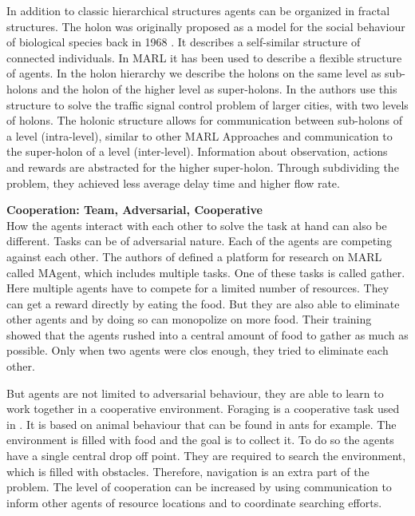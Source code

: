 In addition to classic hierarchical structures agents can be organized in fractal structures. The holon was originally proposed as a model for the social behaviour of biological species back in 1968 \citep{koestler1968ghost}. It describes a self-similar structure of connected individuals. In MARL it has been used to describe a flexible structure of agents. In the holon hierarchy we describe the holons on the same level as sub-holons and the holon of the higher level as super-holons. In \citet{Holonic2013} the authors use this structure to solve the traffic signal control problem of larger cities, with two levels of holons. The holonic structure allows for communication between sub-holons of a level (intra-level), similar to other MARL Approaches and communication to the super-holon of a level (inter-level). Information about observation, actions and rewards are abstracted for the higher super-holon. Through subdividing the problem, they achieved less average delay time and higher flow rate.

\textbf{Cooperation: Team, Adversarial, Cooperative} \\
How the agents interact with each other to solve the task at hand can also be different. Tasks can be of adversarial nature. Each of the agents are competing against each other. The authors of \citet{MAgent2018} defined a platform for research on MARL called MAgent, which includes multiple tasks. One of these tasks is called gather. Here multiple agents have to compete for a limited number of resources. They can get a reward directly by eating the food. But they are also able to eliminate other agents and by doing so can monopolize on more food. Their training showed that the agents rushed into a central amount of food to gather as much as possible. Only when two agents were clos enough, they tried to eliminate each other.\par

But agents are not limited to adversarial behaviour, they are able to learn to work together in a cooperative environment. Foraging is a cooperative task used in \citet{Foraging2013}. It is based on animal behaviour that can be found in ants for example. The environment is filled with food and the goal is to collect it. To do so the agents have a single central drop off point. They are required to search the environment, which is filled with obstacles. Therefore, navigation is an extra part of the problem. The level of cooperation can be increased by using communication to inform other agents of resource locations and to coordinate searching efforts. \par


